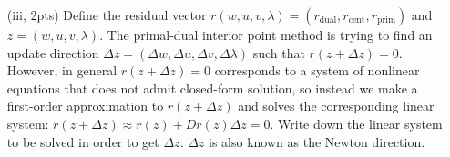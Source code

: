 \documentclass{article}
\theoremstyle{remark}
\theoremstyle{definition}
\begin{document}
\begin{enumerate}[(a)]
\begin{enumerate}[(i)]
        \item[(iii, 2pts)] Define the residual vector $r(w, u, v, \lambda) = (r_{\text{dual}}, r_{\text{cent}}, r_{\text{prim}})$ and $z = (w, u, v, \lambda)$. The primal-dual interior point method is trying to find an update direction $\Delta z = (\Delta w, \Delta u, \Delta v, \Delta\lambda)$ such that $r(z + \Delta z) = 0$. However, in general $r(z + \Delta z) = 0$ corresponds to a system of nonlinear equations that does not admit closed-form solution, so instead we make a first-order approximation to $r(z + \Delta z)$ and solves the corresponding linear system: $r(z + \Delta z)\approx r(z) + Dr(z)\Delta z = 0$. Write down the linear system to be solved in order to get $\Delta z$. $\Delta z$ is also known as the Newton direction.
        
        {
        \color{blue}
        
}
\end{enumerate}
\end{enumerate}
\end{document}
